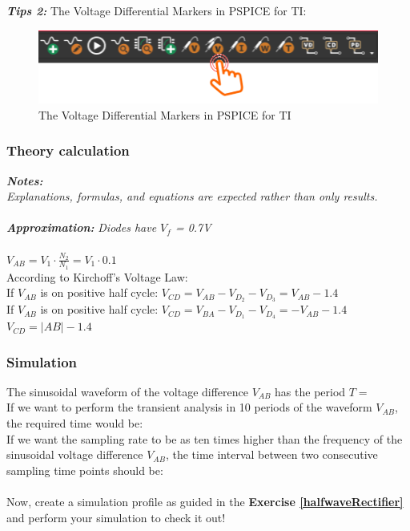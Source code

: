 \textbf{\textit{Tips 2:}}
The Voltage Differential Markers in PSPICE for TI:
\begin{figure}[H]
    \centering
    \includegraphics[width=12cm]{source/picture/bai_2/voltageDifferenceMarkers.png}
    \caption{The Voltage Differential Markers in PSPICE for TI}
    \label{vDiffMkrPair}
\end{figure}

\subsubsection{Theory calculation}
\textit{\textbf{Notes:}}\\

\textit{Explanations, formulas, and equations are expected rather than only results.}\\
\\
\textbf{\textit{Approximation:}} \textit{Diodes have $V_f$ = 0.7V}\bigskip\\
\\
$V_{AB} = V_1 \cdot \frac{N_2}{N_1} = V_1 \cdot 0.1$ \bigskip\\
According to Kirchoff's Voltage Law:\\
If $V_{AB}$ is on positive half cycle: $V_{CD} = V_{AB} - V_{D_2} - V_{D_3} = V_{AB} - 1.4$
\\
If $V_{AB}$ is on positive half cycle: $V_{CD} = V_{BA} - V_{D_1} - V_{D_4} = -V_{AB} - 1.4$
\\

$V_{CD} = |AB| - 1.4$ \bigskip\\


\subsubsection{Simulation}
The sinusoidal waveform of the voltage difference $V_{AB}$ has the period $T = $ \dotfill\\
If we want to perform the transient analysis in 10 periods of the waveform $V_{AB}$, the required time would be:\dotfill\\
If we want the sampling rate to be as ten times higher than the frequency of the sinusoidal voltage difference $V_{AB}$, the time interval between two consecutive sampling time points should be:\dotfill\bigskip\\
\\
Now, create a simulation profile as guided in the \textbf{Exercise \ref{halfwaveRectifier}} and perform your simulation to check it out!\\

